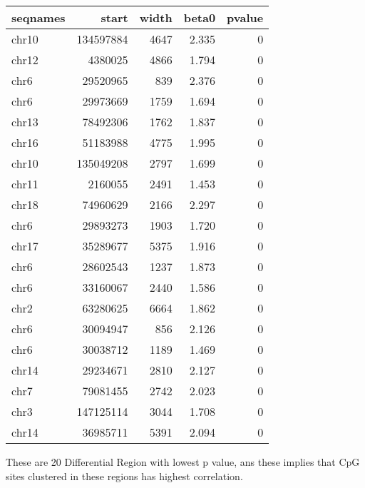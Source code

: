 \documentclass{article}\usepackage[]{graphicx}\usepackage[]{color}
\begin{document}
\begin{tabular}{l|r|r|r|r}
\hline
seqnames & start & width & beta0 & pvalue\\
\hline
chr10 & 134597884 & 4647 & 2.335 & 0\\
\hline
chr12 & 4380025 & 4866 & 1.794 & 0\\
\hline
chr6 & 29520965 & 839 & 2.376 & 0\\
\hline
chr6 & 29973669 & 1759 & 1.694 & 0\\
\hline
chr13 & 78492306 & 1762 & 1.837 & 0\\
\hline
chr16 & 51183988 & 4775 & 1.995 & 0\\
\hline
chr10 & 135049208 & 2797 & 1.699 & 0\\
\hline
chr11 & 2160055 & 2491 & 1.453 & 0\\
\hline
chr18 & 74960629 & 2166 & 2.297 & 0\\
\hline
chr6 & 29893273 & 1903 & 1.720 & 0\\
\hline
chr17 & 35289677 & 5375 & 1.916 & 0\\
\hline
chr6 & 28602543 & 1237 & 1.873 & 0\\
\hline
chr6 & 33160067 & 2440 & 1.586 & 0\\
\hline
chr2 & 63280625 & 6664 & 1.862 & 0\\
\hline
chr6 & 30094947 & 856 & 2.126 & 0\\
\hline
chr6 & 30038712 & 1189 & 1.469 & 0\\
\hline
chr14 & 29234671 & 2810 & 2.127 & 0\\
\hline
chr7 & 79081455 & 2742 & 2.023 & 0\\
\hline
chr3 & 147125114 & 3044 & 1.708 & 0\\
\hline
chr14 & 36985711 & 5391 & 2.094 & 0\\
\hline
\end{tabular}


These are 20 Differential Region with lowest p value, ans these implies that CpG sites clustered in these regions has highest correlation. 
\end{document}
